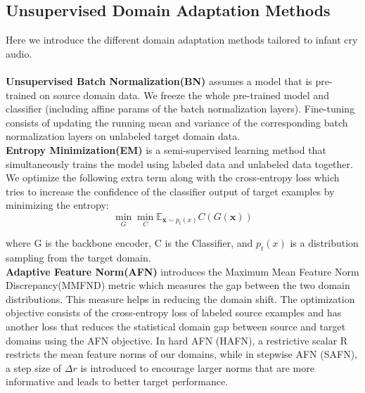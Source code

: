 \documentclass{article}
\begin{document}
\subsection{Unsupervised Domain Adaptation Methods}

Here we introduce the different domain adaptation methods tailored to infant cry audio.\\
\\
\noindent \textbf{Unsupervised Batch Normalization(BN)}\cite{li2016revisiting} assumes a model that is pre-trained on source domain data. We freeze the whole pre-trained model and classifier (including affine params of the batch normalization layers). Fine-tuning consists of updating the running mean and variance of the corresponding batch normalization layers on unlabeled target domain data. \\


\noindent \textbf{Entropy Minimization(EM)}\cite{NIPS2004_96f2b50b}\cite{zhang2018importance} is a semi-supervised learning method that simultaneously trains the model using labeled data and unlabeled data together. We optimize the following extra term along with the cross-entropy loss which tries to increase the confidence of the classifier output of target examples by minimizing the entropy:
\begin{equation}
\min_{G} \min_{C} \mathbb{E}_{\textbf{x}\sim p_t(x)}C(G(\textbf{x}))
\end{equation}
% 
% 

\noindent where G is the backbone encoder,  C is the Classifier, and $p_t(x)$ is a distribution sampling from the target domain.\\ %

\noindent \textbf{Adaptive Feature Norm(AFN)}\cite{xu2019larger} introduces the Maximum Mean Feature Norm Discrepancy(MMFND) metric which measures the gap between the two domain distributions. This measure helps in reducing the domain shift. The optimization objective consists of the cross-entropy loss of labeled source examples and has another loss that reduces the statistical domain gap between source and target domains using the AFN objective. In hard AFN (HAFN), a restrictive scalar R restricts the mean feature norms of our domains, while in stepwise AFN (SAFN), a step size of $\Delta r$ is introduced to encourage larger norms that are more informative and leads to better target performance.\\
\end{document}
